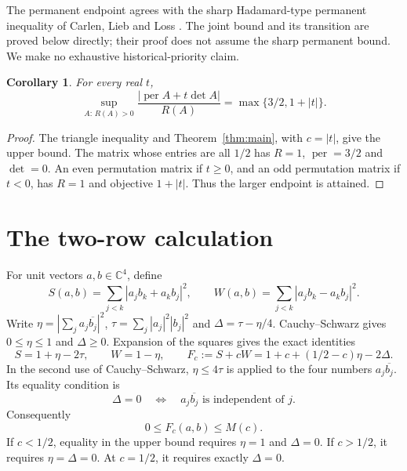 \documentclass[11pt]{article}
\DeclareMathOperator{\per}{per}
\newtheorem{corollary}[theorem]{Corollary}
\begin{document}
The permanent endpoint agrees with the sharp Hadamard-type permanent
inequality of Carlen, Lieb and Loss \cite{CLL}. The joint bound and its
transition are proved below directly; their proof does not assume the
sharp permanent bound. We make no exhaustive historical-priority claim.

\begin{corollary}\label{cor:pencil}
For every real $t$,
\[
 \sup_{A:\,R(A)>0}\frac{|\per A+t\det A|}{R(A)}
       =\max\{3/2,1+|t|\}.
\]
\end{corollary}
\begin{proof}
The triangle inequality and Theorem~\ref{thm:main}, with $c=|t|$, give
the upper bound. The matrix whose entries are all $1/2$ has $R=1$,
$\per=3/2$ and $\det=0$. An even permutation matrix if $t\ge0$, and
an odd permutation matrix if $t<0$, has $R=1$ and objective $1+|t|$.
Thus the larger endpoint is attained.
\end{proof}

\section{The two-row calculation}
For unit vectors $a,b\in\mathbb C^4$, define
\[
 S(a,b)=\sum_{j<k}|a_jb_k+a_kb_j|^2,\qquad
 W(a,b)=\sum_{j<k}|a_jb_k-a_kb_j|^2.
\]
Write $\eta=|\sum_j a_j\overline{b_j}|^2$,
$\tau=\sum_j|a_j|^2|b_j|^2$ and $\Delta=\tau-\eta/4$.
Cauchy--Schwarz gives $0\le\eta\le1$ and $\Delta\ge0$.
Expansion of the squares gives the exact identities
\begin{equation}\label{eq:pair}
 S=1+\eta-2\tau,\qquad W=1-\eta,\qquad
 F_c:=S+cW=1+c+(1/2-c)\eta-2\Delta.
\end{equation}
In the second use of Cauchy--Schwarz, $\eta\le4\tau$ is applied
to the four numbers $a_j\overline{b_j}$. Its equality condition is
\begin{equation}\label{eq:product}
 \Delta=0\quad\Longleftrightarrow\quad
 a_j\overline{b_j}\text{ is independent of }j.
\end{equation}
Consequently
\begin{equation}\label{eq:pairbound}
 0\le F_c(a,b)\le M(c).
\end{equation}
If $c<1/2$, equality in the upper bound requires $\eta=1$ and
$\Delta=0$. If $c>1/2$, it requires $\eta=\Delta=0$.
At $c=1/2$, it requires exactly $\Delta=0$.
\end{document}
